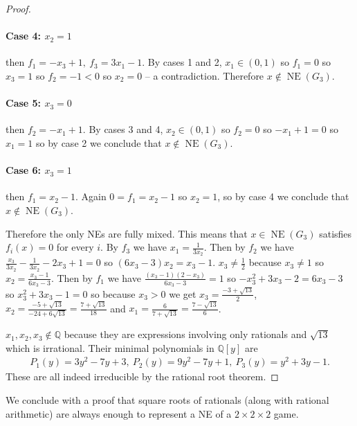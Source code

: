 \documentclass[preprint,12pt,authoryear]{elsarticle}
\newcommand{\Q}{\mathbb{Q}}
\DeclareMathOperator{\NE}{NE}
\begin{document}
\begin{proof}
  \paragraph{Case 4: $x_2=1$} then $f_1=-x_3+1,~f_3=3x_1-1$. By cases 1 and 2, 
  $x_1\in(0,1)$ so $f_1=0$ so $x_3=1$ so $f_2=-1<0$ so $x_2=0$ -- a contradiction.  
  Therefore $x\notin\NE(G_3)$.

  \paragraph{Case 5: $x_3=0$} then $f_2=-x_1+1$. By cases 3 and 4, $x_2\in(0,1)$ so 
  $f_2=0$ so $-x_1+1=0$ so $x_1=1$ so by case 2 we conclude that $x\notin\NE(G_3)$.

  \paragraph{Case 6: $x_3=1$} then $f_1=x_2-1$. Again $0=f_1=x_2-1$ so $x_2=1$, so by case 
  4 we conclude that $x\notin\NE(G_3)$.

  \bigskip

  Therefore the only NEs are fully mixed. This means that $x\in\NE(G_3)$ satisfies 
  $f_i(x)=0$ for every $i$. By $f_3$ we have $x_1=\frac{1}{3x_2}$.
  Then by $f_2$ we have $\frac{x_3}{3x_2}-\frac{1}{3x_2}-2x_3+1=0$ so $(6x_3-3)x_2=x_3-1$.  
  $x_3\ne\frac{1}{2}$ because $x_3\ne1$ so $x_2=\frac{x_3-1}{6x_3-3}$.
  Then by $f_1$ we have $\frac{(x_3-1)(2-x_3)}{6x_3-3}=1$ so $-x_3^2+3x_3-2=6x_3-3$ so 
  $x_3^2+3x_3-1=0$ so because $x_3>0$ we get $x_3=\frac{-3+\sqrt{13}}{2}$, 
  $x_2=\frac{-5+\sqrt{13}}{-24+6\sqrt{13}}=\frac{7+\sqrt{13}}{18}$ and 
  $x_1=\frac{6}{7+\sqrt{13}}=\frac{7-\sqrt{13}}{6}$.

  $x_1,x_2,x_3\notin\Q$ because they are expressions involving only rationals and 
  $\sqrt{13}$ which is irrational. Their minimal polynomials in $\Q[y]$ are
  \begin{align*}
    P_1(y)=3y^2-7y+3,~P_2(y)=9y^2-7y+1,~P_3(y)=y^2+3y-1.
  \end{align*}
  These are all indeed irreducible by the rational root theorem.
\end{proof}

We conclude with a proof that square roots of rationals (along with rational arithmetic) 
are always enough to represent a NE of a $2\times2\times2$ game.
\end{document}
